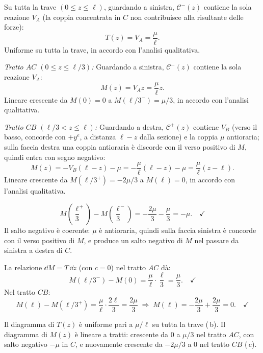 \begin{esempio}
\begin{svolgimento}
		
		Su tutta la trave $(0 \leq z \leq \ell)$,
		guardando a sinistra, $\mathcal{C}^-(z)$ contiene
		la sola reazione $V_A$ (la coppia concentrata
		in $C$ non contribuisce alla risultante delle
		forze):
		\[
		T(z) = V_A = \frac{\mu}{\ell}.
		\]
		Uniforme su tutta la trave, in accordo con
		l'analisi qualitativa.
		
		
		\textit{Tratto $AC$ $(0 \leq z \leq \ell/3)$:}
		Guardando a sinistra, $\mathcal{C}^-(z)$ contiene
		la sola reazione $V_A$:
		\[
		M(z) = V_A z = \frac{\mu}{\ell}z.
		\]
		Lineare crescente da $M(0) = 0$ a
		$M(\ell/3^-) = \mu/3$, in accordo con
		l'analisi qualitativa.
		
		\textit{Tratto $CB$ $(\ell/3 < z \leq \ell)$:}
		Guardando a destra, $\mathcal{C}^+(z)$ contiene
		$V_B$ (verso il basso, concorde con $+y^e$,
		a distanza $\ell-z$ dalla sezione) e la coppia
		$\mu$ antioraria; sulla faccia destra una
		coppia antioraria è discorde con il verso
		positivo di $M$, quindi entra con segno negativo:
		\[
		M(z) = -V_B(\ell-z) - \mu
		= -\frac{\mu}{\ell}(\ell-z) - \mu
		= \frac{\mu}{\ell}(z - \ell).
		\]
		Lineare crescente da $M(\ell/3^+) = -2\mu/3$
		a $M(\ell) = 0$, in accordo con l'analisi
		qualitativa.
		
		\[
		M\!\left(\frac{\ell}{3}^+\right) -
		M\!\left(\frac{\ell}{3}^-\right)
		= -\frac{2\mu}{3} - \frac{\mu}{3}
		= -\mu. \quad\checkmark
		\]
		Il salto negativo è coerente: $\mu$ è
		antioraria, quindi sulla faccia sinistra è
		concorde con il verso positivo di $M$, e
		produce un salto negativo di $M$ nel passare
		da sinistra a destra di $C$.
		
		La relazione $\dd M = T\,\dd z$ (con $c = 0$) nel
		tratto $AC$ dà:
		\[
		M(\ell/3^-) - M(0)
		= \frac{\mu}{\ell}\cdot\frac{\ell}{3}
		= \frac{\mu}{3}. \quad\checkmark
		\]
		Nel tratto $CB$:
		\[
		M(\ell) - M(\ell/3^+)
		= \frac{\mu}{\ell}\cdot\frac{2\ell}{3}
		= \frac{2\mu}{3}
		\;\Rightarrow\;
		M(\ell) = -\frac{2\mu}{3}
		+ \frac{2\mu}{3} = 0. \quad\checkmark
		\]
		
		\noindent
		Il diagramma di $T(z)$ è uniforme pari a
		$\mu/\ell$ su tutta la trave (\,b).
		Il diagramma di $M(z)$ è lineare a tratti:
		crescente da $0$ a $\mu/3$ nel tratto $AC$,
		con salto negativo $-\mu$ in $C$, e
		nuovamente crescente da $-2\mu/3$ a $0$
		nel tratto $CB$ (\,c).
		
	\end{svolgimento}
\end{esempio}


